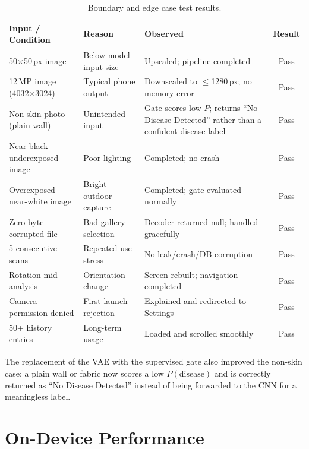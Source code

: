 \begin{table}[H]
\centering
\caption{Boundary and edge case test results.}
\label{tab:edge_cases}
\begin{tabular}{|p{4cm}|p{4cm}|p{4cm}|c|}
\hline
\textbf{Input / Condition} & \textbf{Reason} & \textbf{Observed} & \textbf{Result} \\ \hline
50$\times$50\,px image & Below model input size & Upscaled; pipeline completed & Pass \\ \hline
12\,MP image (4032$\times$3024) & Typical phone output & Downscaled to $\le$1280\,px; no memory error & Pass \\ \hline
Non-skin photo (plain wall) & Unintended input & Gate scores low $P$; returns ``No Disease Detected'' rather than a confident disease label & Pass \\ \hline
Near-black underexposed image & Poor lighting & Completed; no crash & Pass \\ \hline
Overexposed near-white image & Bright outdoor capture & Completed; gate evaluated normally & Pass \\ \hline
Zero-byte corrupted file & Bad gallery selection & Decoder returned null; handled gracefully & Pass \\ \hline
5 consecutive scans & Repeated-use stress & No leak/crash/DB corruption & Pass \\ \hline
Rotation mid-analysis & Orientation change & Screen rebuilt; navigation completed & Pass \\ \hline
Camera permission denied & First-launch rejection & Explained and redirected to Settings & Pass \\ \hline
50+ history entries & Long-term usage & Loaded and scrolled smoothly & Pass \\ \hline
\end{tabular}
\end{table}

\noindent The replacement of the VAE with the supervised gate also improved the
non-skin case: a plain wall or fabric now scores a low $P(\text{disease})$ and is
correctly returned as ``No Disease Detected'' instead of being forwarded to the
CNN for a meaningless label.

\section{On-Device Performance}

